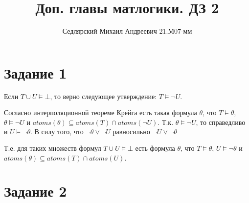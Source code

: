 \documentclass{article}
\title{Доп. главы матлогики. ДЗ 2}
\author{Седлярский Михаил Андреевич 21.М07-мм}
\date{ }
\begin{document}
\maketitle

\section*{Задание 1}
Если \(T \cup U \models \bot\), то верно следующее утверждение: 
\(T \models \neg U\).

Согласно интерполяционной теореме Крейга есть такая формула \(\theta\), что
\(T \models \theta\), \(\theta \models \neg U\) и 
\(atoms(\theta) \subseteq atoms(T) \cap atoms(\neg U)\). 
Т.к. \(\theta \models \neg U\), то справедливо и \(U \models \neg \theta\).
В силу того, что \(\neg \theta \lor \neg U\) равносильно \(\neg U \lor \neg \theta\)

Т.е. для таких множеств формул \(T \cup U \models \bot\) есть формула \(\theta\), что
\(T \models \theta\), \(U \models \neg \theta\) 
и \(atoms(\theta) \subseteq atoms(T) \cap atoms(U)\).


\section*{Задание 2}
\end{document}
